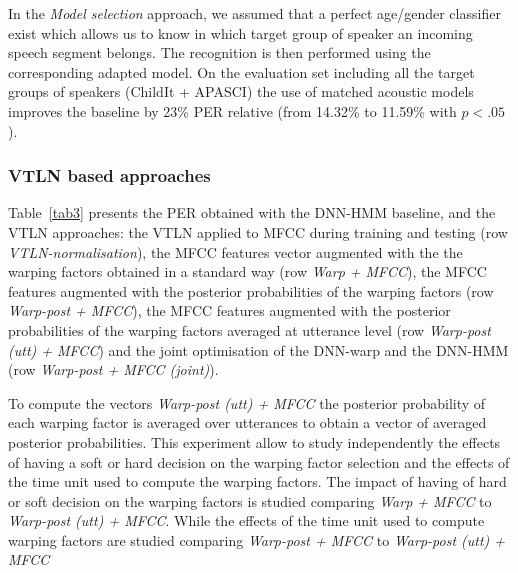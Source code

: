 \documentclass{nle}
\begin{document}
In the {\em Model selection} approach, we assumed that a perfect age/gender classifier exist which allows us to know in which target group of speaker an incoming speech segment belongs. The recognition is then performed using the corresponding adapted model. On the evaluation set including all the target groups of speakers (ChildIt + APASCI) the use of matched acoustic models  improves the baseline by 23\% PER relative (from 14.32\% to 11.59\% with $p<.05$).

\subsubsection{VTLN based approaches}
Table~\ref{tab3}  presents the PER obtained with the DNN-HMM baseline, and the VTLN approaches: the VTLN applied to MFCC during training and testing (row {\em VTLN-normalisation}), the MFCC features vector augmented with the the warping factors obtained in a standard way (row {\em Warp + MFCC}), the MFCC features augmented with the posterior probabilities of the warping factors (row {\em Warp-post + MFCC}), the MFCC features augmented with the posterior probabilities of the warping factors averaged at utterance level (row {\em Warp-post (utt) + MFCC}) and the joint optimisation of the DNN-warp and the DNN-HMM (row {\em Warp-post + MFCC (joint)}). 

To compute the vectors {\em Warp-post (utt) + MFCC} the posterior probability of each warping factor is averaged over utterances to obtain a vector of averaged posterior probabilities. This experiment allow to study independently the effects of having a soft or hard decision on the warping factor selection and the effects of the time unit used to compute the warping factors. The impact of having of hard or soft decision on the warping factors is studied comparing {\em Warp + MFCC} to {\em Warp-post (utt) + MFCC}. While the effects of the time unit used to compute warping factors are studied comparing {\em Warp-post + MFCC} to {\em Warp-post (utt) + MFCC}
\end{document}
